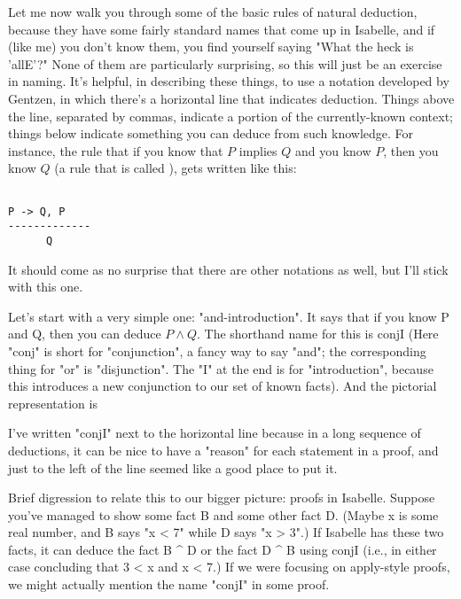Let me now walk you through some of the basic rules of natural deduction, because they have some fairly standard names that come up in Isabelle, and if (like me) you don't know them, you find yourself saying "What the heck is 'allE'?" None of them are particularly surprising, so this will just be an exercise in naming. It's helpful, in describing these things, to use a notation developed by Gentzen, in which there's a horizontal line that indicates deduction. Things above the line, separated by commas, indicate a portion of the currently-known context; things below indicate something you can deduce from such knowledge. For instance, the rule that if you know that $P$ implies $Q$ and you know $P$, then you know $Q$ (a rule that is called ), gets written like this:

\begin{verbatim}
    
P -> Q, P
-------------
      Q
\end{verbatim}


It should come as no surprise that there are other notations as well, but I'll stick with this one. 

Let's start with a very simple one: "and-introduction". It says that if you know P and Q, then you can deduce $P \wedge  Q$. The shorthand name for this is conjI (Here "conj" is short for "conjunction", a fancy way to say "and"; the corresponding thing for "or" is "disjunction". The "I" at the end is for "introduction", because this introduces a new conjunction to our set of known facts). And the pictorial representation is

\begin{prooftree}
\end{prooftree}

I've written "conjI" next to the horizontal line because in a long sequence of deductions, it can be nice to have a "reason" for each statement in a proof, and just to the left of the line seemed like a good place to put it. 

Brief digression to relate this to our bigger picture: proofs in Isabelle. Suppose you've managed to show some fact B and some other fact D. (Maybe x is some real number, and B says "x < 7" while D says "x > 3".) If Isabelle has these two facts, it can deduce the fact B ^ D or the fact D ^ B using conjI (i.e., in either case concluding that 3 < x and x < 7.) If we were focusing on apply-style proofs, we might actually mention the name "conjI" in some proof. 

